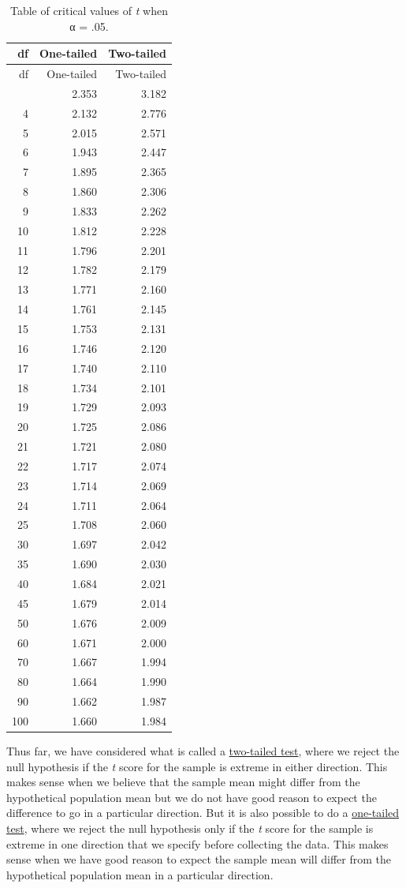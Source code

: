 \documentclass[
]{krantz}
\begin{document}
\begin{longtable}[]{@{}rrr@{}}
\caption{\label{tab:tcrit} Table of critical values of \emph{t} when α = .05.}\tabularnewline
\toprule\noalign{}
df & One-tailed & Two-tailed \\
\midrule\noalign{}
\endfirsthead
\toprule\noalign{}
df & One-tailed & Two-tailed \\
\midrule\noalign{}
\endhead
\bottomrule\noalign{}
\endlastfoot
3 & 2.353 & 3.182 \\
4 & 2.132 & 2.776 \\
5 & 2.015 & 2.571 \\
6 & 1.943 & 2.447 \\
7 & 1.895 & 2.365 \\
8 & 1.860 & 2.306 \\
9 & 1.833 & 2.262 \\
10 & 1.812 & 2.228 \\
11 & 1.796 & 2.201 \\
12 & 1.782 & 2.179 \\
13 & 1.771 & 2.160 \\
14 & 1.761 & 2.145 \\
15 & 1.753 & 2.131 \\
16 & 1.746 & 2.120 \\
17 & 1.740 & 2.110 \\
18 & 1.734 & 2.101 \\
19 & 1.729 & 2.093 \\
20 & 1.725 & 2.086 \\
21 & 1.721 & 2.080 \\
22 & 1.717 & 2.074 \\
23 & 1.714 & 2.069 \\
24 & 1.711 & 2.064 \\
25 & 1.708 & 2.060 \\
30 & 1.697 & 2.042 \\
35 & 1.690 & 2.030 \\
40 & 1.684 & 2.021 \\
45 & 1.679 & 2.014 \\
50 & 1.676 & 2.009 \\
60 & 1.671 & 2.000 \\
70 & 1.667 & 1.994 \\
80 & 1.664 & 1.990 \\
90 & 1.662 & 1.987 \\
100 & 1.660 & 1.984 \\
\end{longtable}

Thus far, we have considered what is called a \hyperref[two-tailed-test]{two-tailed test}, where we reject the null hypothesis if the \emph{t} score for the sample is extreme in either direction. This makes sense when we believe that the sample mean might differ from the hypothetical population mean but we do not have good reason to expect the difference to go in a particular direction. But it is also possible to do a \hyperref[one-tailed-test]{one-tailed test}, where we reject the null hypothesis only if the \emph{t} score for the sample is extreme in one direction that we specify before collecting the data. This makes sense when we have good reason to expect the sample mean will differ from the hypothetical population mean in a particular direction.
\end{document}
